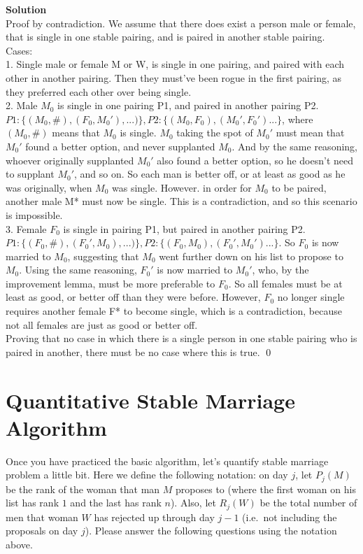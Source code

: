\documentclass[11pt]{article}
\newcommand*{\Question}[1]{\section{#1}}
\newenvironment{Parts}{\begin{enumerate}[label=(\alph*)]}{\end{enumerate}}
\begin{document}
\begin{Parts}
\begin{mdframed} \textbf{Solution} \\
Proof by contradiction. We assume that there does exist a person male or female, that is single in one stable pairing, and is paired in another stable pairing. \\
Cases: \\
1. Single male or female M or W, is single in one pairing, and paired with each other in another pairing. Then they must've been rogue in the first pairing, as they preferred each other over being single.  \\
2. Male $M_0$ is single in one pairing P1, and paired in another pairing P2.\\ $P1:\{(M_0, \#), (F_0, M_0'), ...)\}, P2:\{(M_0, F_0), (M_0',F_0')...\}$, where $(M_0, \#)$ means that $M_0$ is single. $M_0$ taking the spot of $M_0'$ must mean that $M_0'$ found a better option, and never supplanted $M_0$. And by the same reasoning, whoever originally supplanted $M_0'$ also found a better option, so he doesn't need to supplant $M_0'$, and so on. So each man is better off, or at least as good as he was originally, when $M_0$ was single. However. in order for $M_0$ to be paired, another male M* must now be single. This is a contradiction, and so this scenario is impossible. \\
3. Female $F_0$ is single in pairing P1, but paired in another pairing P2. \\$P1:\{(F_0, \#), (F_0', M_0), ...)\}, P2:\{(F_0, M_0), (F_0', M_0')...\}$. So $F_0$ is now married to $M_0$, suggesting that $M_0$ went further down on his list to propose to $M_0$. Using the same reasoning, $F_0'$ is now married to $M_0'$, who, by the improvement lemma, must be more preferable to $F_0$. So all females must be at least as good, or better off than they were before. However, $F_0$ no longer single requires another female F* to become single, which is a contradiction, because not all females are just as good or better off. \\
Proving that no case in which there is a single person in one stable pairing who is paired in another, there must be no case where this is true. \qed
\end{mdframed}

\end{Parts}

\Question{Quantitative Stable Marriage Algorithm}

Once you have practiced the basic algorithm, let's quantify stable marriage problem a little bit. Here we define the following notation: on day $j$, let $P_j(M)$ be the rank of the woman that man $M$ proposes to (where the first woman on his list has rank $1$ and the last has rank $n$). Also, let $R_j(W)$ be the total number of men that woman $W$ has rejected up through day $j-1$ (i.e.\ not including the proposals on day $j$). Please answer the following questions using the notation above.
\end{document}
